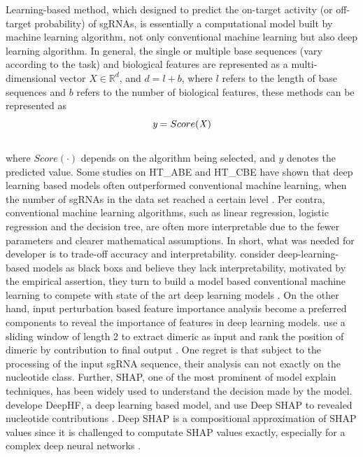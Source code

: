 \documentclass{bioinfo}
\begin{document}
Learning-based method, which designed to predict the on-target activity (or off-target probability) of sgRNAs, 
 is essentially a computational model built by machine learning algorithm, not only conventional machine learning but also deep learning algorithm. 
 In general, the single or multiple base sequences (vary according to the task) and biological features are represented as a multi-dimensional vector $X\in\mathbb{R}^d$, 
 and $d=l+b$, where $l$ refers to the length of base sequences and $b$ refers to the number of biological features, these methods can be represented as
\begin{equation}
\text{\it y}=Score(\it X)\label{eq:01}\vspace*{-10pt}
\end{equation}\\
 where $Score(\cdot)$ depends on the algorithm being selected, and $y$ denotes the predicted value.
 Some studies on HT\_ABE and HT\_CBE have shown that deep learning based models often outperformed conventional machine learning, when the number of sgRNAs in the data set reached a certain level \citep{Song2020,kim2018deep,kim2019spcas9}. 
 Per contra, conventional machine learning algorithms, such as linear regression, logistic regression and the decision tree, are often more interpretable due to the fewer parameters and clearer mathematical assumptions. 
 In short, what was needed for developer is to trade-off accuracy and interpretability. 
 \citeauthor{MuhammadRafid2020} consider deep-learning-based models as black boxs and believe they lack interpretability, 
 motivated by the empirical assertion, they turn to build a model based conventional machine learning to compete with state of the art deep learning models \citep{MuhammadRafid2020}. 
 On the other hand, input perturbation based feature importance analysis become a preferred components to reveal the importance of features in deep learning models. 
 \citeauthor{Liu2019} use a sliding window of length 2 to extract dimeric as input and rank the position of dimeric by contribution to final output \citep{Liu2019}. 
 One regret is that subject to the processing of the input sgRNA sequence, their analysis can not exactly on the nucleotide class. 
 Further, SHAP, one of the most prominent of model explain techniques, has been widely used to understand the decision made by the model. 
 \citeauthor{wang2019optimized} develope DeepHF, a deep learning based model, and use Deep SHAP to revealed nucleotide contributions \citep{wang2019optimized}. 
 Deep SHAP is a compositional approximation of SHAP values since it is challenged to computate SHAP values exactly, especially for a complex deep neural networks \citep{lundberg2017a}. 
\end{document}
